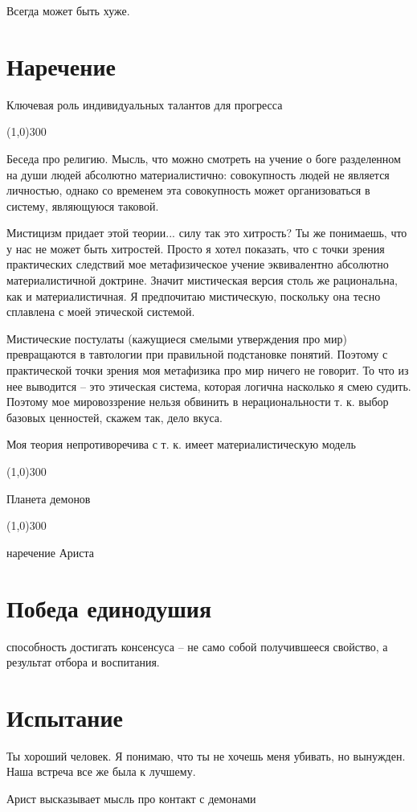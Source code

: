 \documentclass[12pt,a4paper]{article}
\newcommand{\sep}{
	\begin{center}
		\line(1,0){300}
	\end{center}
}
\begin{document}
Всегда может быть хуже.

\section*{Наречение}
Ключевая роль индивидуальных талантов для прогресса

\sep

Беседа про религию. Мысль, что можно смотреть на учение о боге разделенном на души людей абсолютно материалистично: совокупность людей не является личностью, однако со временем эта совокупность может организоваться в систему, являющуюся таковой.

Мистицизм придает этой теории... силу
так это хитрость?
Ты же понимаешь, что у нас не может быть хитростей. Просто я хотел показать, что с точки зрения практических следствий мое метафизическое учение эквивалентно абсолютно материалистичной доктрине. Значит мистическая версия столь же рациональна, как и материалистичная. Я предпочитаю мистическую, поскольку она тесно сплавлена с моей этической системой.

Мистические постулаты (кажущиеся смелыми утверждения про мир) превращаются в тавтологии при правильной подстановке понятий. Поэтому с практической точки зрения моя метафизика про мир ничего не говорит. То что из нее выводится -- это этическая система, которая логична насколько я смею судить. Поэтому мое мировоззрение нельзя обвинить в нерациональности т. к. выбор базовых ценностей, скажем так, дело вкуса.

Моя теория непротиворечива с т. к. имеет материалистическую модель
\sep

Планета демонов

\sep

наречение Ариста

\section*{Победа единодушия}

способность достигать консенсуса -- не само собой получившееся свойство, а результат отбора и воспитания.

\section*{Испытание}

Ты хороший человек. Я понимаю, что ты не хочешь меня убивать, но вынужден. Наша встреча все же была к лучшему.

Арист высказывает мысль про контакт с демонами
\end{document}
